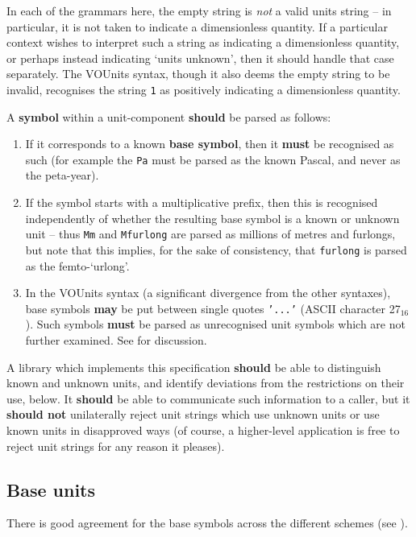 \documentclass[11pt,a4paper]{ivoa}
\newcommand{\unit}[1]{\texttt{\small\color{orange}#1}}
\newcommand*\hex[1]{\uppercase{#1}${}_{16}$}
\newcommand*\norm[1]{\textbf{\color{ivoacolor}#1}}
\begin{document}
In each of the grammars here, the empty string is
\emph{not} a valid units string -- in particular, it is not taken to
indicate a dimensionless quantity.
If a particular context wishes to interpret such a string as indicating a
dimensionless quantity, or perhaps instead indicating `units unknown',
then it should handle that case separately.
The VOUnits syntax, though it also deems the empty string to be
invalid, recognises the string \unit{1} as positively indicating a dimensionless quantity.

A \textbf{symbol} within a unit-component \norm{should} be parsed as follows:
\begin{enumerate}
\item If it corresponds to a known \textbf{base symbol}, then it
\norm{must} be recognised as such (for example the \unit{Pa} must be
parsed as the known Pascal, and never as the peta-year).

\item If the symbol starts with a multiplicative prefix, then this is
recognised independently of whether the resulting base symbol is a
known or unknown unit -- thus \unit{Mm} and \unit{Mfurlong} are parsed
as millions of metres and furlongs, but note that this implies, for
the sake of consistency, that \unit{furlong} is parsed as the
femto-`urlong'.

\item In the VOUnits syntax (a significant divergence from the other
syntaxes), base symbols \norm{may} be put between single
quotes \unit{'...'} (ASCII character \hex{27}).
Such symbols \norm{must} be parsed as
unrecognised unit symbols which are not further examined.
See  for discussion.
\end{enumerate}

A library which implements this specification \norm{should} be able to
distinguish known and unknown units, and identify deviations from the
restrictions on their use, below.  It \norm{should} be able to
communicate such information to a caller, but it \norm{should not}
unilaterally reject unit strings which use unknown units or use known
units in disapproved ways (of course, a higher-level application is
free to reject unit strings for any reason it pleases).

\subsection{Base units\label{sec:baseUnits}}

There is good agreement for the base symbols across the different schemes
(see ).
\end{document}
